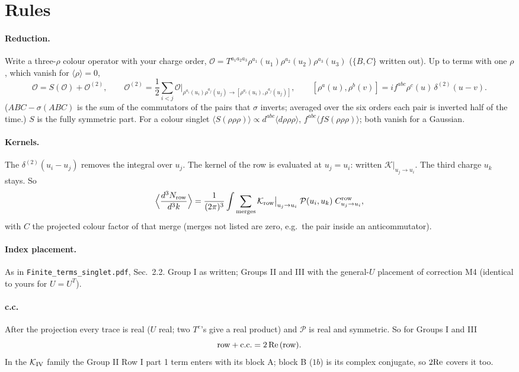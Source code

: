 \documentclass[10pt]{article}
\numberwithin{equation}{section}
\newcommand{\PP}{\mathcal P}
\newcommand{\OO}{\mathcal O}
\begin{document}
\section{Rules}\label{sec:rules}
\paragraph{Reduction.} Write a three-$\rho$ colour operator with your charge order, $\OO=T^{a_1a_2a_3}\rho^{a_1}(u_1)\rho^{a_2}(u_2)\rho^{a_3}(u_3)$ ($\{B,C\}$ written out). Up to terms with one $\rho$, which vanish for $\langle\rho\rangle=0$,
\begin{equation}
\OO=S(\OO)+\OO^{(2)},\qquad \OO^{(2)}=\frac12\sum_{i<j}\OO\Big|_{\rho^{a_i}(u_i)\rho^{a_j}(u_j)\to[\rho^{a_i}(u_i),\rho^{a_j}(u_j)]},\qquad[\rho^a(u),\rho^b(v)]=if^{abc}\rho^c(u)\,\delta^{(2)}(u-v).
\end{equation}
($ABC-\sigma(ABC)$ is the sum of the commutators of the pairs that $\sigma$ inverts; averaged over the six orders each pair is inverted half of the time.) $S$ is the fully symmetric part. For a colour singlet $\langle S(\rho\rho\rho)\rangle\propto d^{abc}\langle d\rho\rho\rho\rangle$, $f^{abc}\langle fS(\rho\rho\rho)\rangle$; both vanish for a Gaussian.
\paragraph{Kernels.} The $\delta^{(2)}(u_i-u_j)$ removes the integral over $u_j$. The kernel of the row is evaluated at $u_j=u_i$: written $\mathcal K\big|_{u_j\to u_i}$. The third charge $u_k$ stays. So
\begin{equation}
\Big\langle\frac{d^3N_{\rm row}}{d^3k}\Big\rangle=\frac{1}{(2\pi)^3}\int\sum_{\rm merges}\mathcal K_{\rm row}\big|_{u_j\to u_i}\;\PP(u_i,u_k)\;C^{\rm row}_{u_j\to u_i},\label{eq:three}
\end{equation}
with $C$ the projected colour factor of that merge (merges not listed are zero, e.g.\ the pair inside an anticommutator).
\paragraph{Index placement.} As in \texttt{Finite\_terms\_singlet.pdf}, Sec.~2.2. Group I as written; Groups II and III with the general-$U$ placement of correction M4 (identical to yours for $U=U^T$).
\paragraph{c.c.} After the projection every trace is real ($U$ real; two $T^e$'s give a real product) and $\PP$ is real and symmetric. So for Groups I and III
\begin{equation}
\text{row}+{\rm c.c.}=2\,{\rm Re}\,(\text{row}).
\end{equation}
In the $\mathcal K_{\rm IV}$ family the Group II Row I part 1 term enters with its block A; block B ($1b$) is its complex conjugate, so $2{\rm Re}$ covers it too.
\end{document}
